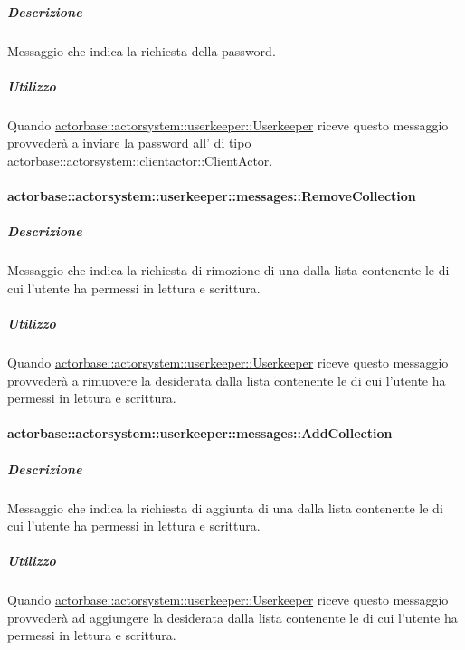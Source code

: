 \documentclass{scalatekids-article}
\begin{document}
\subparagraph{Descrizione}

Messaggio che indica la richiesta della password.

\subparagraph{Utilizzo}

Quando \hyperref[sec:actorbase::actorsystem::userkeeper::Userkeeper]{actorbase::\allowbreak{}actorsystem::\allowbreak{}userkeeper::\allowbreak{}Userkeeper}
riceve questo messaggio provvederà a inviare la password all' di tipo
\hyperref[sec:actorbase::actorsystem::clientactor::ClientActor]{actorbase::\allowbreak{}actorsystem::\allowbreak{}clientactor::\allowbreak{}ClientActor}.

\paragraph{actorbase::actorsystem::userkeeper::messages::RemoveCollection}
\label{sec:actorbase::actorsystem::userkeeper::messages::RemoveCollection}

\subparagraph{Descrizione}

Messaggio che indica la richiesta di rimozione di una  dalla
lista contenente le  di cui l'utente ha permessi in lettura
e scrittura.

\subparagraph{Utilizzo}

Quando \hyperref[sec:actorbase::actorsystem::userkeeper::Userkeeper]{actorbase::\allowbreak{}actorsystem::\allowbreak{}userkeeper::\allowbreak{}Userkeeper}
riceve questo messaggio provvederà a rimuovere la  desiderata
dalla lista contenente le  di cui l'utente ha permessi in
lettura e scrittura.

\paragraph{actorbase::actorsystem::userkeeper::messages::AddCollection}
\label{sec:actorbase::actorsystem::userkeeper::messages::AddCollection}

\subparagraph{Descrizione}

Messaggio che indica la richiesta di aggiunta di una  dalla
lista contenente le  di cui l'utente ha permessi in lettura
e scrittura.

\subparagraph{Utilizzo}

Quando \hyperref[sec:actorbase::actorsystem::userkeeper::Userkeeper]{actorbase::\allowbreak{}actorsystem::\allowbreak{}userkeeper::\allowbreak{}Userkeeper}
riceve questo messaggio provvederà ad aggiungere la  desiderata
dalla lista contenente le  di cui l'utente ha permessi in
lettura e scrittura.
\end{document}
